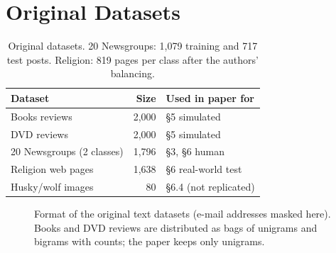 \documentclass[11pt]{article}
\begin{document}
\section{Original Datasets}
\label{sec:origdata}

\begin{table}[t]
\centering\small
\begin{tabular}{@{}lrl@{}}
\toprule
Dataset & Size & Used in paper for \\
\midrule
Books reviews & 2,000 & \S5 simulated \\
DVD reviews & 2,000 & \S5 simulated \\
20 Newsgroups (2 classes) & 1,796 & \S3, \S6 human \\
Religion web pages & 1,638 & \S6 real-world test \\
Husky/wolf images & 80 & \S6.4 (not replicated) \\
\bottomrule
\end{tabular}
\caption{Original datasets. 20 Newsgroups: 1,079 training and 717 test posts. Religion: 819 pages per class after the authors' balancing.}
\label{tab:origdata}
\end{table}

\begin{figure}[t]
\centering\scriptsize
{}
\caption{Format of the original text datasets (e-mail addresses masked here). Books and DVD reviews are distributed as bags of unigrams and bigrams with counts; the paper keeps only unigrams.}
\label{fig:origsnippets}
\end{figure}
\end{document}
